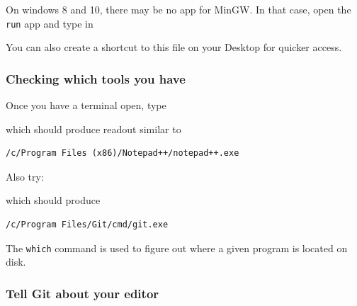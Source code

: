 On windows 8 and 10, there may be no app for MinGW. In that case, open
the \texttt{run} app and type in

\begin{Shaded}
\begin{Highlighting}[]
\end{Highlighting}
\end{Shaded}

You can also create a shortcut to this file on your Desktop for quicker
access.

\subsubsection{Checking which tools you
have}\label{checking-which-tools-you-have}

Once you have a terminal open, type

\begin{Shaded}
\begin{Highlighting}[]
 
\end{Highlighting}
\end{Shaded}

which should produce readout similar to

\begin{verbatim}
/c/Program Files (x86)/Notepad++/notepad++.exe
\end{verbatim}

Also try:

\begin{Shaded}
\begin{Highlighting}[]
 
\end{Highlighting}
\end{Shaded}

which should produce

\begin{verbatim}
/c/Program Files/Git/cmd/git.exe
\end{verbatim}

The \texttt{which} command is used to figure out where a given program
is located on disk.

\subsubsection{Tell Git about your
editor}\label{tell-git-about-your-editor}

